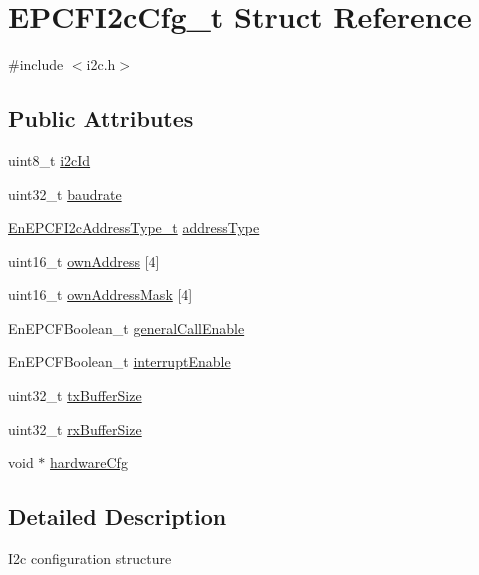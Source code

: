 \hypertarget{structEPCFI2cCfg__t}{}\section{E\+P\+C\+F\+I2c\+Cfg\+\_\+t Struct Reference}
\label{structEPCFI2cCfg__t}


{\ttfamily \#include $<$i2c.\+h$>$}

\subsection*{Public Attributes}
\begin{DoxyCompactItemize}
\item 
uint8\+\_\+t \mbox{\hyperlink{structEPCFI2cCfg__t_a242335b86cbb644f8c508a3f4542cba4}{i2c\+Id}}
\item 
uint32\+\_\+t \mbox{\hyperlink{structEPCFI2cCfg__t_a4c5b7780c549be941a235d94b7b87820}{baudrate}}
\item 
\mbox{\hyperlink{i2c_8h_a9bc5b2ac9d948097d750f5a4f570ad44}{En\+E\+P\+C\+F\+I2c\+Address\+Type\+\_\+t}} \mbox{\hyperlink{structEPCFI2cCfg__t_a077674811c9aca0ae9f04d3fd083f715}{address\+Type}}
\item 
uint16\+\_\+t \mbox{\hyperlink{structEPCFI2cCfg__t_a555a4c5296c0c6822093aaa0138210fa}{own\+Address}} \mbox{[}4\mbox{]}
\item 
uint16\+\_\+t \mbox{\hyperlink{structEPCFI2cCfg__t_a2efb97b4637d6b1ef818af955e10d535}{own\+Address\+Mask}} \mbox{[}4\mbox{]}
\item 
En\+E\+P\+C\+F\+Boolean\+\_\+t \mbox{\hyperlink{structEPCFI2cCfg__t_a96a1d83f32bfdd572fc4f4cb761be77f}{general\+Call\+Enable}}
\item 
En\+E\+P\+C\+F\+Boolean\+\_\+t \mbox{\hyperlink{structEPCFI2cCfg__t_a4d9b944d5a24e937a8c954f4ef1ddeac}{interrupt\+Enable}}
\item 
uint32\+\_\+t \mbox{\hyperlink{structEPCFI2cCfg__t_adea9d88eb9ceea68e9d8f80751f8323b}{tx\+Buffer\+Size}}
\item 
uint32\+\_\+t \mbox{\hyperlink{structEPCFI2cCfg__t_aba06d6840c5c10f64da13828ea288bc5}{rx\+Buffer\+Size}}
\item 
void $\ast$ \mbox{\hyperlink{structEPCFI2cCfg__t_ab09efee943f748026eca099031f8bcda}{hardware\+Cfg}}
\end{DoxyCompactItemize}


\subsection{Detailed Description}
I2c configuration structure

